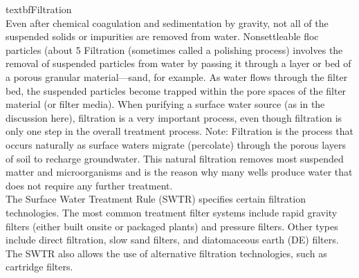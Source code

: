 \documentclass{article}
\begin{document}
textbf{Filtration}\\
Even after chemical coagulation and sedimentation by gravity, not all of the suspended solids or impurities are removed from water. Nonsettleable floc particles (about 5%
Filtration (sometimes called a polishing process) involves the removal of suspended particles from water by passing it through a layer or bed of a porous granular material—sand, for example. As water flows through the filter bed, the suspended particles become trapped within the pore spaces of the filter material (or filter media). When purifying a surface water source (as in the discussion here), filtration is a very important process, even though filtration is only one step in the overall treatment process.
Note: Filtration is the process that occurs naturally as surface waters migrate (percolate) through the porous layers of soil to recharge groundwater. This natural filtration removes most suspended matter and microorganisms and is the reason why many wells produce water that does not require any further treatment.\\
The Surface Water Treatment Rule (SWTR) specifies certain filtration technologies. The most common treatment filter systems include rapid gravity filters (either built onsite or packaged plants) and pressure filters. Other types include direct filtration, slow sand filters, and diatomaceous earth (DE) filters. The SWTR also allows the use of alternative filtration technologies, such as cartridge filters.\\
\end{document}

